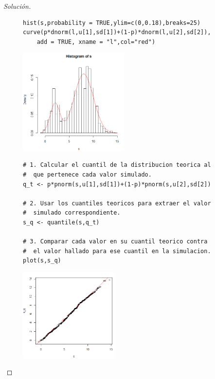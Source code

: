 \documentclass[11pt]{article}
\renewcommand{\=}[1]{\stackrel{#1}{=}} %
\newenvironment{sol}
{\begin{proof}[Solución]}
	{\end{proof}}
\theoremstyle{definition}
\theoremstyle{remark}
\begin{document}
\begin{itemize}
\begin{sol}
\begin{figure}[h]
	\hspace*{0.9cm}\begin{minipage}{10.3cm}
		{
			\begin{lstlisting}[style=myRstyle, caption={Verificación mediante histograma / MN.}]
hist(s,probability = TRUE,ylim=c(0,0.18),breaks=25)
curve(p*dnorm(l,u[1],sd[1])+(1-p)*dnorm(l,u[2],sd[2]),
	add = TRUE, xname = "l",col="red")			
			\end{lstlisting}
		}			
	\end{minipage}
	\begin{minipage}{6cm}
		\includegraphics[width=5.5cm]{hist2}
	\end{minipage}
\end{figure}
\begin{figure}[h]
	\hspace*{0.9cm}\begin{minipage}{10.5cm}
		{
			\begin{lstlisting}[style=myRstyle, caption={Verificación mediante gráfica de cuantiles / MN.}]
# 1. Calcular el cuantil de la distribucion teorica al
#  que pertenece cada valor simulado.
q_t <- p*pnorm(s,u[1],sd[1])+(1-p)*pnorm(s,u[2],sd[2])

# 2. Usar los cuantiles teoricos para extraer el valor
#  simulado correspondiente.
s_q <- quantile(s,q_t)

# 3. Comparar cada valor en su cuantil teorico contra
#  el valor hallado para ese cuantil en la simulacion.
plot(s,s_q)
			\end{lstlisting}
		}			
	\end{minipage}
	\begin{minipage}{6cm}
		\includegraphics[width=5cm]{qu2}
	\end{minipage}
\end{figure}


\end{sol}
\end{itemize}
\end{document}

